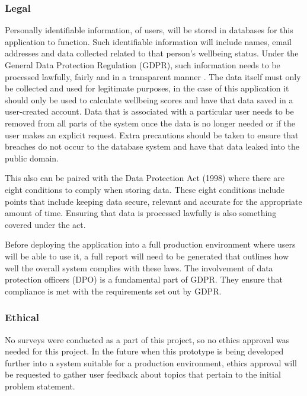 \subsubsection{Legal}
Personally identifiable information, of users, will be stored in databases for this application to function.
Such identifiable information will include names, email addresses and data collected related to that person's wellbeing status.
Under the General Data Protection Regulation (GDPR), such information needs to be processed lawfully, fairly and in a transparent manner \cite{unihighlands2018sevenprinciples}.
The data itself must only be collected and used for legitimate purposes, in the case of this application it should only be used to calculate wellbeing 
scores and have that data saved in a user-created account.
Data that is associated with a particular user needs to be removed from all parts of the system once the data is no longer needed or if the user makes
an explicit request.
Extra precautions should be taken to ensure that breaches do not occur to the database system and have that data leaked into the public domain.

This also can be paired with the Data Protection Act (1998) where there are eight conditions to comply when storing data.
These eight conditions include points that include keeping data secure, relevant and accurate for the appropriate amount of time. 
Ensuring that data is processed lawfully is also something covered under the act.

Before deploying the application into a full production environment where users will be able to use it, a full report will need to be generated that
outlines how well the overall system complies with these laws.
The involvement of data protection officers (DPO) is a fundamental part of GDPR. 
They ensure that compliance is met with the requirements set out by GDPR.

\subsubsection{Ethical}
No surveys were conducted as a part of this project, so no ethics approval was needed for this project.
In the future when this prototype is being developed further into a system suitable for a production environment, ethics approval will be requested
to gather user feedback about topics that pertain to the initial problem statement.

